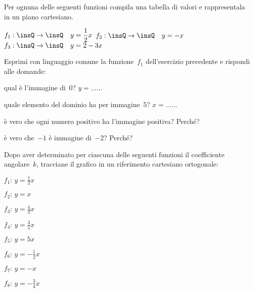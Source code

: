 \begin{esercizio}
\label{ese:D.37}
Per ognuna delle seguenti funzioni compila una tabella di valori e 
rappresentala in un piano cartesiano.

 \(f_1:\insQ \rightarrow \insQ\quad y=\dfrac{1}{2}x\) \quad
 \(f_2:\insQ \rightarrow \insQ\quad y=-x\) \quad
 \(f_3:\insQ \rightarrow \insQ\quad y=2-3x\)
\end{esercizio}

\begin{esercizio}
\label{ese:D.38}
Esprimi con linguaggio comune la funzione~\(f_1\) dell'esercizio precedente e 
rispondi alle domande:

\begin{enumeratea}
\item qual è l'immagine di~\(0\)?  \(y=\ldots \ldots \)
\item quale elemento del dominio ha per immagine~\(5\)? \(x=\ldots \ldots \)
\item è vero che ogni numero positivo ha l'immagine positiva? Perché?
\item è vero che~\(-1\) è immagine di~\(-2\)? Perché?
\end{enumeratea}
\end{esercizio}

\begin{esercizio}
\label{ese:D.39}
Dopo aver determinato per ciascuna delle seguenti funzioni il coefficiente 
angolare~\(k\), tracciane il grafico in un riferimento cartesiano ortogonale:
\begin{multicols}{3}
 \begin{enumeratea}
\item \(f_{1}:\, y=\frac{1}{2}x\)
\item \(f_{2}:\, y=x\)
\item \(f_{3}:\, y=\frac{4}{3}x\)
\item \(f_{4}:\, y=\frac{3}{5}x\)
\item \(f_{5}:\, y=5x\)
\item \(f_{6}:\, y=-{\frac{1}{2}}x\)
\item \(f_{7}:\, y=-x\)
\item \(f_{8}:\, y=-{\frac{3}{4}}x\)
\end{enumeratea}
\end{multicols}
\end{esercizio}

